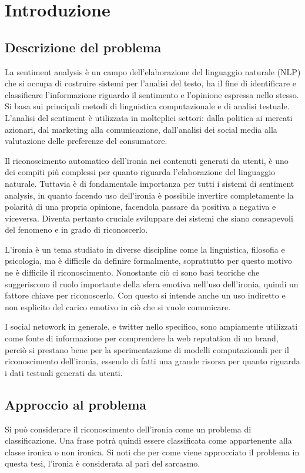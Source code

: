\documentclass[oneside]{book}
\begin{document}
\tableofcontents


\chapter{Introduzione}

\section{Descrizione del problema}

La sentiment analysis è un campo dell'elaborazione del linguaggio naturale (NLP) che si occupa di costruire sistemi per l'analisi del testo, ha il fine di identificare e classificare l'informazione riguardo il sentimento e l'opinione espressa nello stesso. Si basa sui principali metodi di linguistica computazionale e di analisi testuale. L'analisi del sentiment è utilizzata in molteplici settori: dalla politica ai mercati azionari, dal marketing alla comunicazione, dall'analisi dei social media alla valutazione delle preferenze del consumatore. 

Il riconoscimento automatico dell'ironia nei contenuti generati da utenti, è uno dei compiti più complessi per quanto riguarda l'elaborazione del linguaggio naturale. Tuttavia è di fondamentale importanza per tutti i sistemi di sentiment analysis, in quanto facendo uso dell'ironia è possibile invertire completamente la polarità di una propria opinione, facendola passare da positiva a negativa e viceversa.
Diventa pertanto cruciale sviluppare dei sistemi che siano consapevoli del fenomeno e in grado di riconoscerlo.

L'ironia è un tema studiato in diverse discipline come la linguistica, filosofia e psicologia, ma è difficile da definire formalmente, soprattutto per questo motivo ne è difficile il riconoscimento. Nonostante ciò ci sono basi teoriche che suggeriscono il ruolo importante della sfera emotiva nell'uso dell'ironia, quindi un fattore chiave per riconoscerlo. Con questo si intende anche un uso indiretto e non esplicito del carico emotivo in ciò che si vuole comunicare.

I social netowork in generale, e twitter nello specifico, sono ampiamente utilizzati come fonte di informazione per comprendere la web reputation di un brand, perciò si prestano bene per la sperimentazione di modelli computazionali per il riconoscimento dell'ironia, essendo di fatti una grande risorsa per quanto riguarda i dati testuali generati da utenti.


\section{Approccio al problema}
Si può considerare il riconoscimento dell'ironia come un problema di classificazione. Una frase potrà quindi essere classificata come appartenente alla classe ironica o non ironica. Si noti che per come viene approcciato il problema in questa tesi, l'ironia è considerata al pari del sarcasmo.
\end{document}
